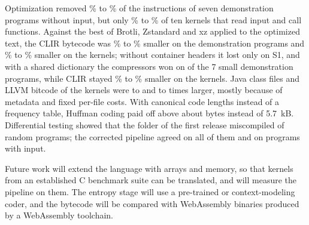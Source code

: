 \documentclass{ieeeaccess}
\newcommand{\clir}{CLIR}
\begin{document}
Optimization removed \nredSMin\% to \nredSMax\% of the instructions of seven demonstration programs without input, but only \nredKMin\% to \nredKMax\% of ten kernels that read input and call functions. Against the best of Brotli, Zstandard and xz applied to the optimized text, the \clir{} bytecode was \ncmpFramedSMin\% to \ncmpFramedSMax\% smaller on the demonstration programs and \ncmpFramedKMin\% to \ncmpFramedKMax\% smaller on the kernels; without container headers it lost only on S1, and with a shared dictionary the compressors won on \ndictLosersCount{} of the 7 small demonstration programs, while \clir{} stayed \ncmpDictKMin\% to \ncmpDictKMax\% smaller on the kernels. Java class files and LLVM bitcode of the kernels were \njavaRatioMin{} to \njavaRatioMax{} and \nbitcodeRatioMin{} to \nbitcodeRatioMax{} times larger, mostly because of metadata and fixed per-file costs. With canonical code lengths instead of a frequency table, Huffman coding paid off above about \nhuffHi{} bytes instead of 5.7~kB. Differential testing showed that the folder of the first release miscompiled \ndiffReleasedDiffer{} of \ndiffPrograms{} random programs; the corrected pipeline agreed on all of them and on \ndiffInputPrograms{} programs with input.

Future work will extend the language with arrays and memory, so that kernels from an established C benchmark suite can be translated, and will measure the pipeline on them. The entropy stage will use a pre-trained or context-modeling coder, and the bytecode will be compared with WebAssembly binaries produced by a WebAssembly toolchain.
\end{document}
